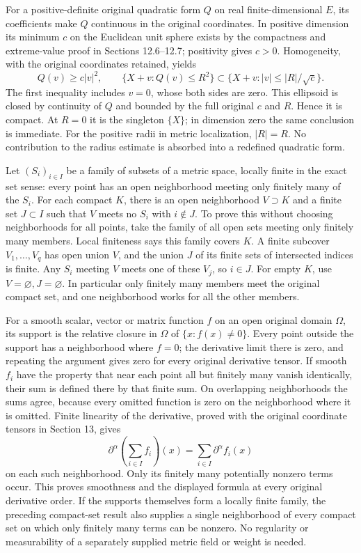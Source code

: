 \documentclass[
  11pt,
]{article}
\begin{document}
For a positive-definite original quadratic form \(Q\) on real
finite-dimensional \(E\), its coefficients make \(Q\) continuous in the
original coordinates. In positive dimension its minimum \(c\) on the
Euclidean unit sphere exists by the compactness and extreme-value proof
in Sections 12.6--12.7; positivity gives \(c>0\). Homogeneity, with the
original coordinates retained, yields \[
 Q(v)\geq c|v|^2,\qquad
 \{X+v:Q(v)\leq R^2\}
 \subset\{X+v:|v|\leq |R|/\sqrt c\}.
 \tag{GC6}
\] The first inequality includes \(v=0\), whose both sides are zero.
This ellipsoid is closed by continuity of \(Q\) and bounded by the full
original \(c\) and \(R\). Hence it is compact. At \(R=0\) it is the
singleton \(\{X\}\); in dimension zero the same conclusion is immediate.
For the positive radii in metric localization, \(|R|=R\). No
contribution to the radius estimate is absorbed into a redefined
quadratic form.

Let \((S_i)_{i\in I}\) be a family of subsets of a metric space, locally
finite in the exact set sense: every point has an open neighborhood
meeting only finitely many of the \(S_i\). For each compact \(K\), there
is an open neighborhood \(V\supset K\) and a finite set \(J\subset I\)
such that \(V\) meets no \(S_i\) with \(i\notin J\). To prove this
without choosing neighborhoods for all points, take the family of all
open sets meeting only finitely many members. Local finiteness says this
family covers \(K\). A finite subcover \(V_1,\ldots,V_q\) has open union
\(V\), and the union \(J\) of its finite sets of intersected indices is
finite. Any \(S_i\) meeting \(V\) meets one of these \(V_j\), so
\(i\in J\). For empty \(K\), use \(V=\varnothing,J=\varnothing\). In
particular only finitely many members meet the original compact set, and
one neighborhood works for all the other members.

For a smooth scalar, vector or matrix function \(f\) on an open original
domain \(\Omega\), its support is the relative closure in \(\Omega\) of
\(\{x:f(x)\ne0\}\). Every point outside the support has a neighborhood
where \(f=0\); the derivative limit there is zero, and repeating the
argument gives zero for every original derivative tensor. If smooth
\(f_i\) have the property that near each point all but finitely many
vanish identically, their sum is defined there by that finite sum. On
overlapping neighborhoods the sums agree, because every omitted function
is zero on the neighborhood where it is omitted. Finite linearity of the
derivative, proved with the original coordinate tensors in Section 13,
gives \[
 \partial^\alpha\!\left(\sum_{i\in I}f_i\right)(x)
     =\sum_{i\in I}\partial^\alpha f_i(x)
 \tag{GC7}
\] on each such neighborhood. Only its finitely many potentially nonzero
terms occur. This proves smoothness and the displayed formula at every
original derivative order. If the supports themselves form a locally
finite family, the preceding compact-set result also supplies a single
neighborhood of every compact set on which only finitely many terms can
be nonzero. No regularity or measurability of a separately supplied
metric field or weight is needed.
\end{document}
